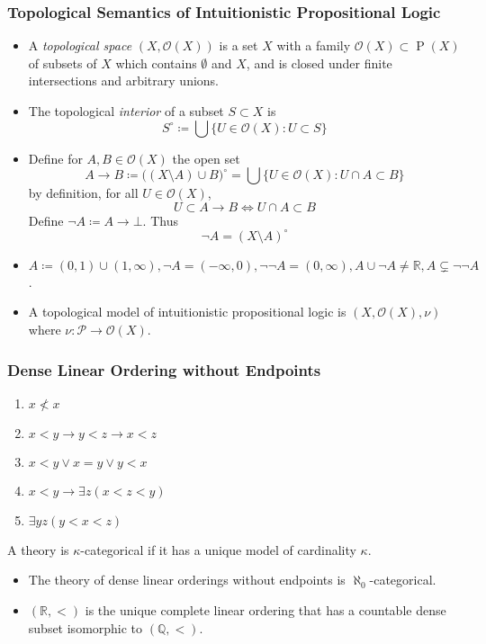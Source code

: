 \documentclass[UTF8,11pt,colorlinks,compress,openany]{beamer}%
\begin{document}
\begin{frame}\frametitle{Topological Semantics of Intuitionistic Propositional Logic}
\begin{itemize}
	\item A \emph{topological space} $(X,\mathcal{O}(X))$ is a set $X$ with a family $\mathcal{O}(X)\subset\operatorname{P}(X)$ of subsets of $X$ which contains $\emptyset$ and $X$, and is closed under finite intersections and arbitrary unions.
	\item The topological \emph{interior} of a subset $S\subset X$ is
	\[S^\circ\coloneqq \bigcup\big\{U\in\mathcal{O}(X): U\subset S\big\}\]
	\item Define for $A,B\in\mathcal{O}(X)$ the open set
	\[A\to B \coloneqq \big((X\setminus A)\cup B\big)^\circ=\bigcup\big\{U\in\mathcal{O}(X):U\cap A\subset B\big\}\]
	by definition, for all $U\in\mathcal{O}(X)$,
	\[U\subset A\to B\iff U\cap A\subset B\]
	Define $\neg A\coloneqq A\to\bot$. Thus
	\[\neg A=(X\setminus A)^\circ\]
	\item $A\coloneqq (0,1)\cup(1,\infty), \neg A=(-\infty,0), \neg\neg A=(0,\infty), A\cup\neg A\ne\mathbb{R}, A\subsetneq\neg\neg A$.
	\item A topological model of intuitionistic propositional logic is $(X,\mathcal{O}(X),\nu)$ where $\nu:\mathcal{P}\to\mathcal{O}(X)$.
\end{itemize}
\end{frame}

\begin{frame}\frametitle{Dense Linear Ordering without Endpoints}
	\begin{enumerate}
		\item $x\nless x$
		\item $x<y\to y<z\to x<z$
		\item $x<y\vee x=y\vee y<x$
		\item $x<y\to\exists z(x<z<y)$
		\item $\exists yz(y<x<z)$
	\end{enumerate}
	\begin{definition}
	A theory is $\kappa$-categorical if it has a unique model of cardinality $\kappa$.
	\end{definition}
	\begin{theorem}[Cantor]
		\begin{itemize}
			\item The theory of dense linear orderings without endpoints is $\aleph_0$-categorical.
			\item $(\mathbb{R},<)$ is the unique complete linear ordering that has a countable dense subset isomorphic to $(\mathbb{Q},<)$.
		\end{itemize}
	\end{theorem}
\end{frame}
\end{document}
